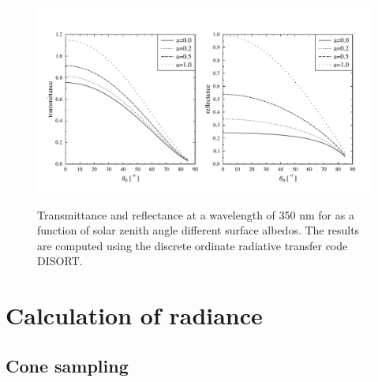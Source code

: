 \documentclass[12pt,twoside,a4paper]{article}
\begin{document}
\begin{figure}[htbp]
  \centering
  \includegraphics[width=1.0\hsize]{./figs/lambert.pdf}\\
  \caption{Transmittance and reflectance at a wavelength of 350 nm for
    as a function of solar zenith angle different surface
    albedos. The results are computed using the
    discrete ordinate radiative transfer code DISORT.}
  \label{fig:lambert}
\end{figure}

\cleardoublepage 

\section{Calculation of radiance}

\subsection{Cone sampling}
\end{document}
